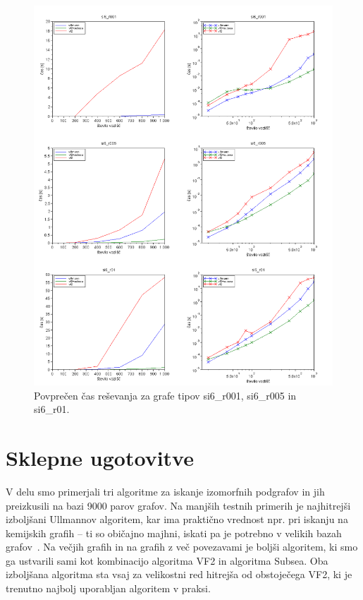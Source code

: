\documentclass[a4paper, 12pt, ]{book}
\begin{document}
\begin{figure}
\begin{center}
\includegraphics[width=15cm]{img/results2_si6.png}
\end{center}
\caption{Povprečen čas reševanja za grafe tipov si6\_r001, si6\_r005 in si6\_r01.}
\label{pic_res2_si6}
\end{figure}




\chapter{Sklepne ugotovitve}

	V delu smo primerjali tri algoritme za iskanje izomorfnih podgrafov in jih preizkusili na bazi 9000 parov grafov. Na manjših testnih primerih je najhitrejši
	izboljšani Ullmannov algoritem, kar ima praktično vrednost npr. pri iskanju na kemijskih grafih -- ti so običajno majhni, iskati pa je potrebno v velikih
	bazah grafov~\cite{chem}. Na večjih grafih in na grafih z več povezavami je boljši algoritem, ki smo ga ustvarili sami kot kombinacijo algoritma VF2
	in algoritma Subsea. Oba izboljšana algoritma sta vsaj za velikostni red hitrejša od obstoječega VF2, ki je trenutno najbolj uporabljan algoritem v praksi.
	
\end{document}
